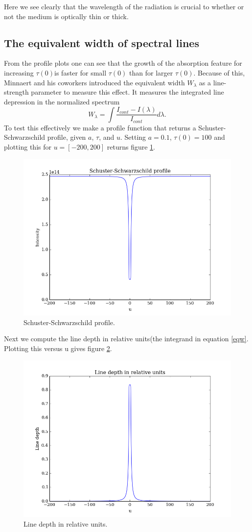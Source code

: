 \documentclass{aa}   %
\begin{document}
Here we see clearly that the wavelength of the radiation is crucial to whether or not the medium is optically thin or thick.
\subsection{The equivalent width of spectral lines}
From the profile plots one can see that the growth of the absorption feature for increasing $\tau(0)$is faster for small $\tau(0)$ than for larger $\tau(0)$. Because of this, Minnaert and his coworkers introduced the equivalent width $W_\lambda$ as a line-strength parameter to measure this effect. It measures the integrated line depression in the normalized spectrum
\begin{equation}
 W_\lambda = \int \frac{I_{cont}-I(\lambda)}{I_{cont}}d\lambda.
\end{equation}\label{eqw}
To test this effectively we make a profile function that returns a Schuster-Schwarzschild profile, given $a$, $\tau$, and $u$.  Setting $a = 0.1$, $\tau(0) = 100$ and plotting this for $ u = [-200,200]$ returns figure \ref{eqw_ss}.
\begin{figure}
 \includegraphics[width=.49\textwidth]{eqw_ss.png}
 \caption{Schuster-Schwarzschild profile.}
 \label{eqw_ss} 
\end{figure}

Next we compute the line depth in relative units(the integrand in equation \ref{eqw}. Plotting this versus u gives figure \ref{eqw_rel}.
\begin{figure}
 \includegraphics[width=.49\textwidth]{eqw_rel.png}
 \caption{Line depth in relative units.}
 \label{eqw_rel} 
\end{figure}
\end{document}
